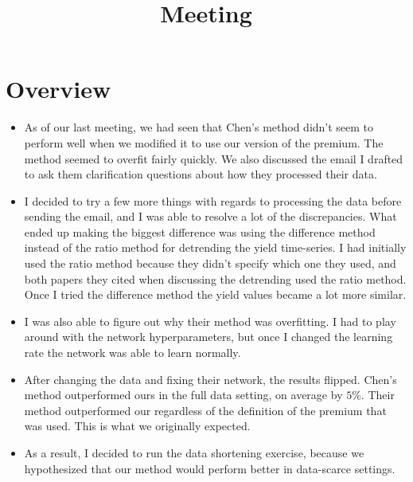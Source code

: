 \documentclass[11pt]{article}
\title{Meeting}
\begin{document}
\maketitle
\section{Overview}
  \begin{itemize}
    \item As of our last meeting, we had seen that Chen's method didn't seem to perform well when we modified it to use our version of the premium. The method seemed to overfit fairly quickly. We also discussed the email I drafted to ask them clarification questions about how they processed their data. 
    \item I decided to try a few more things with regards to processing the data before sending the email, and I was able to resolve a lot of the discrepancies. What ended up making the biggest difference was using the difference method instead of the ratio method for detrending the yield time-series. I had initially used the ratio method because they didn't specify which one they used, and both papers they cited when discussing the detrending used the ratio method. Once I tried the difference method the yield values became a lot more similar. 
    \item I was also able to figure out why their method was overfitting. I had to play around with the network hyperparameters, but once I changed the learning rate the network was able to learn normally. 
    \item After changing the data and fixing their network, the results flipped. Chen's method outperformed ours in the full data setting, on average by $5\%$. Their method outperformed our regardless of the definition of the premium that was used. This is what we originally expected.  
    \item As a result, I decided to run the data shortening exercise, because we hypothesized that our method would perform better in data-scarce settings.  
  \end{itemize}
\end{document}
